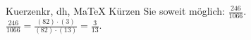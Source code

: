 \begin{MAufgabe}{Kuerzen}{kr, dh, MaTeX}
K\"urzen Sie soweit m\"oglich: $\frac{246}{1066}$.\\ 
\ifLsg\MLoesung
\quad $\frac{246}{1066}=\frac{(82)\cdot(3)}{(82)\cdot(13)}=\frac{3}{13}$.\else\relax\fi
 \end{MAufgabe}